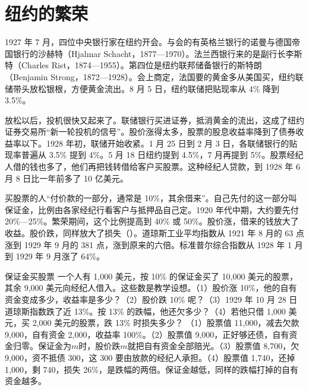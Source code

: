 \section{纽约的繁荣}\label{sec:interwar-boom}

1927 年 7 月，四位中央银行家在纽约开会\cite{brown1940}。与会的有英格兰银行的诺曼与德国帝国银行的沙赫特（Hjalmar Schacht，1877—1970）。法兰西银行来的是副行长李斯特（Charles Rist，1874—1955）\cite{bnf27}。第四位是纽约联邦储备银行的斯特朗（Benjamin Strong，1872—1928）\cite{bnf27,brown1940}。会上商定，法国要的黄金多从美国买，纽约联储带头放松银根，方便黄金流出\cite{brown1940}。8 月 5 日，纽约联储把贴现率从 4\% 降到 3.5\%\cite{brown1940}。

放松以后，投机很快又起来了。联储银行买进证券，抵消黄金的流出，这成了纽约证券交易所“新一轮投机的信号”\cite{brown1940}。股价涨得太多，股票的股息收益率降到了债券收益率以下\cite{brown1940}。1928 年初，联储开始收紧。1 月 25 日到 2 月 3 日，各联储银行的贴现率普遍从 3.5\% 提到 4\%。5 月 18 日纽约提到 4.5\%，7 月再提到 5\%\cite{brown1940}。股票经纪人借的钱也多了，他们再把钱转借给客户买股票。这种经纪人贷款，到 1928 年 6 月 8 日比一年前多了 10 亿美元\cite{brown1940}。

买股票的人“付价款的一部分，通常是 10\%，其余借来”\cite{frh2013}。自己先付的这一部分叫保证金，比例由各家经纪行看客户与抵押品自己定。1920 年代中期，大约要先付 20\%—25\%。繁荣期间，这个比例提高到 40\% 或 50\%\cite{rappoport1991}。股价涨，借来的钱放大了收益。股价跌，同样放大了损失（）。道琼斯工业平均指数从 1921 年 8 月的 63 点涨到 1929 年 9 月的 381 点，涨到原来的六倍\cite{frh2013}。标准普尔综合指数从 1928 年 1 月到 1929 年 9 月涨了 64\%\cite{delong1990}。

\begin{example}{保证金买股票}\label{ex:interwar-margin}
一个人有 1,000 美元，按 10\% 的保证金买了 10,000 美元的股票，其余 9,000 美元向经纪人借入\cite{frh2013}。这些数是教学设想。（1）股价涨 10\%，他的自有资金变成多少，收益率是多少？（2）股价跌 10\% 呢？（3）1929 年 10 月 28 日道琼斯指数跌了近 13\%\cite{frh2013}。按 13\% 的跌幅，他还欠多少？（4）若他只借 1,000 美元，买 2,000 美元的股票，跌 13\% 时损失多少？
\solution （1）股票值 11,000，减去欠款 9,000，自有资金 2,000，收益率 100\%。（2）股票值 9,000，正好够还债，自有资金归零。保证金为$m$时，股价跌$m$就把自有资金全部赔光。（3）股票值 8,700，欠 9,000，资不抵债 300，这 300 要由放款的经纪人承担。（4）股票值 1,740，还掉 1,000，剩 740，损失 26\%，是跌幅的两倍。保证金越低，同样的跌幅打掉的自有资金越多。
\end{example}


